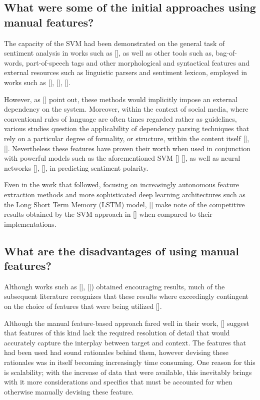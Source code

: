 \documentclass[12pt, a4paper]{report}
\theoremstyle{definition}
\theoremstyle{definition}%
\theoremstyle{definition}%
\theoremstyle{definition}%
\theoremstyle{definition}%
\theoremstyle{definition}%
\renewcommand{\cite}[1]{[\citealp{#1}]}
\begin{document}
\subsection{What were some of the initial approaches using manual features?}
The capacity of the SVM had been demonstrated on the general task of sentiment analysis in works such as \cite{pang2002}, as well as other tools such as, bag-of-words, part-of-speech tags and other morphological and syntactical features and external resources such as linguistic parsers and sentiment lexicon, employed in works such as \cite{dong}, \cite{vo2015}, \cite{nguyen2015}. 

However, as \cite{tang2016b} point out, these methods would implicitly impose an external dependency on the system. Moreover, within the context of social media, where conventional rules of language are often times regarded rather as guidelines, various studies question the applicability of dependency parsing techniques that rely on a particular degree of formality, or structure, within the content itself \cite{tang2016b}, \cite{chen2017}. Nevertheless these features have proven their worth when used in conjunction with powerful models such as the aforementioned SVM \cite{kiritchenko} \cite{wagner2014}, as well as neural networks \cite{dong}, \cite{vo2015}, in predicting sentiment polarity.

Even in the work that followed, focusing on increasingly autonomous feature extraction methods and more sophisticated deep learning architectures such as the Long Short Term Memory (LSTM) model, \cite{tang2016b} make note of the competitive results obtained by the SVM approach in \cite{kiritchenko} when compared to their implementations. 

\subsection{What are the disadvantages of using manual features?}
Although works such as \cite{kiritchenko}, \cite{wagner2014}) obtained encouraging results, much of the subsequent literature recognizes that these results where exceedingly contingent on the choice of features that were being utilized \cite{tang2016b}.

Although the manual feature-based approach fared well in their work, \cite{tang2016b} suggest that features of this kind lack the required resolution of detail that would accurately capture the interplay between target and context. The features that had been used had sound rationales behind them, however devising these rationales was in itself becoming increasingly time consuming. One reason for this is scalability; with the increase of data that were available, this inevitably brings with it more considerations and specifics that must be accounted for when otherwise manually devising these feature.
\end{document}

